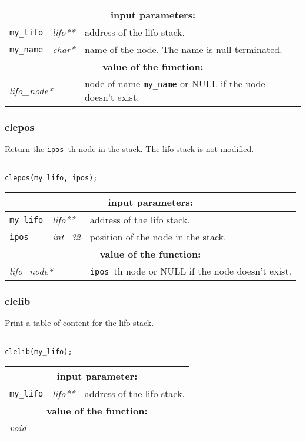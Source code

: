 \noindent
\begin{tabular}{|p{1.5cm}|p{2cm}|p{11cm}|}
\hline
\multicolumn{3}{|c|}{\bf input parameters:} \\
\hline
{\tt my\_lifo} & {\it lifo**} & address of the lifo stack. \\
\hline
{\tt my\_name} & {\it char*} & name of the node. The name is null-terminated. \\
\hline
\multicolumn{3}{|c|}{\bf value of the function:} \\
\hline
\multicolumn{2}{|l|}{\it lifo\_node*} & node of name {\tt my\_name} or NULL if the node doesn't exist. \\
\hline
\end{tabular}

\subsubsection{clepos}
Return the {\tt ipos}--th node in the stack. The lifo stack is not modified.
\begin{verbatim}

clepos(my_lifo, ipos);
\end{verbatim}

\noindent
\begin{tabular}{|p{1.5cm}|p{2cm}|p{11cm}|}
\hline
\multicolumn{3}{|c|}{\bf input parameters:} \\
\hline
{\tt my\_lifo} & {\it lifo**} & address of the lifo stack. \\
\hline
{\tt ipos} & {\it int\_32} & position of the node in the stack. \\
\hline
\multicolumn{3}{|c|}{\bf value of the function:} \\
\hline
\multicolumn{2}{|l|}{\it lifo\_node*} & {\tt ipos}--th node or NULL if the node doesn't exist. \\
\hline
\end{tabular}

\subsubsection{clelib}
Print a table-of-content for the lifo stack.
\begin{verbatim}

clelib(my_lifo);
\end{verbatim}

\noindent
\begin{tabular}{|p{1.5cm}|p{2cm}|p{11cm}|}
\hline
\multicolumn{3}{|c|}{\bf input parameter:} \\
\hline
{\tt my\_lifo} & {\it lifo**} & address of the lifo stack. \\
\hline
\multicolumn{3}{|c|}{\bf value of the function:} \\
\hline
\multicolumn{2}{|l|}{\it void} &  \\
\hline
\end{tabular}

